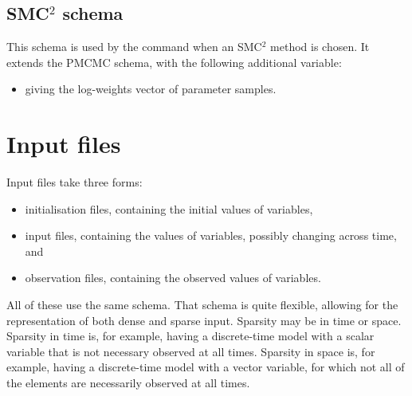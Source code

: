 \subsection{SMC$^2$ schema}

This schema is used by the  command when an SMC$^2$ method
is chosen. It extends the PMCMC schema, with the following additional
variable:
\begin{itemize}
\item {} giving the log-weights vector of parameter samples.
\end{itemize}


\section{Input files\label{Input_files}}

Input files take three forms:
\begin{itemize}
\item initialisation files, containing the initial values of 
  variables,
\item input files, containing the values of  variables, possibly
  changing across time, and
\item observation files, containing the observed values of 
  variables.
\end{itemize}
All of these use the same schema. That schema is quite flexible, allowing for
the representation of both dense and sparse input. Sparsity may be in time or
space. Sparsity in time is, for example, having a discrete-time model with a
scalar  variable that is not necessary observed at all
times. Sparsity in space is, for example, having a discrete-time model with a
vector  variable, for which not all of the elements are necessarily
observed at all times.

